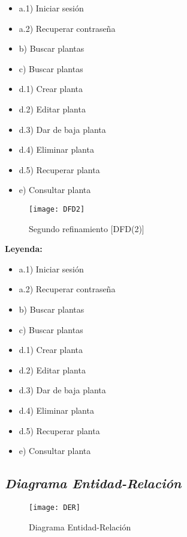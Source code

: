 \documentclass[10pt,a4paper]{article}
\begin{document}
	\begin{itemize}[label=]
		\item a.1) Iniciar sesión
		\item a.2) Recuperar contraseña \\
		\item b) Buscar plantas \\
		\item c) Buscar plantas \\
		\item d.1) Crear planta
		\item d.2) Editar planta
		\item d.3) Dar de baja planta
		\item d.4) Eliminar planta
		\item d.5) Recuperar planta\\
		\item e) Consultar planta
	\end{itemize}
	
\vspace{3cm}

\begin{wrapfigure}[11]{l}{10cm}
\texttt{[image: DFD2]}
\caption{Segundo refinamiento [DFD(2)]}
\end{wrapfigure}


\textbf{Leyenda:}

	\begin{itemize}[label=]
		\item a.1) Iniciar sesión
		\item a.2) Recuperar contraseña \\
		\item b) Buscar plantas \\
		\item c) Buscar plantas \\
		\item d.1) Crear planta
		\item d.2) Editar planta
		\item d.3) Dar de baja planta
		\item d.4) Eliminar planta
		\item d.5) Recuperar planta\\
		\item e) Consultar planta
	\end{itemize}

\newpage
\subsection{\textbf{\textit{Diagrama Entidad-Relación}}}


\begin{figure} [h!]
\centering \texttt{[image: DER]}
\caption{Diagrama Entidad-Relación}
\end{figure}
\end{document}
